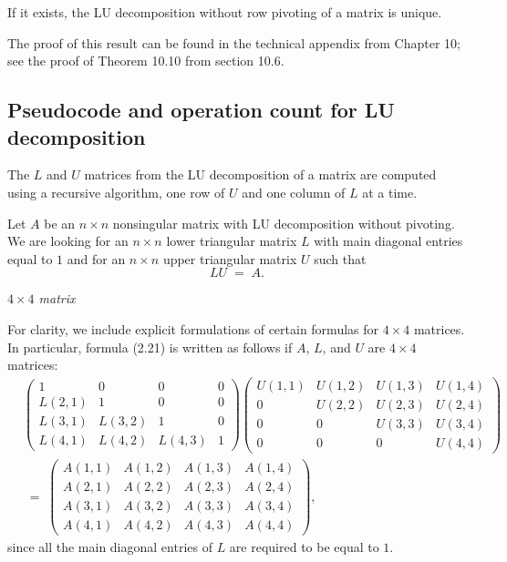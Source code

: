 \begin{theorem}
If it exists, the LU decomposition without row pivoting of a matrix is
unique.
\end{theorem}

The proof of this result can be found in the technical appendix from
Chapter 10; see the proof of Theorem 10.10 from section 10.6.

\subsection{Pseudocode and operation count for LU decomposition}

The $L$ and $U$ matrices from the LU decomposition of a matrix are
computed using a recursive algorithm, one row of $U$ and one column of
$L$ at a time.

Let $A$ be an $n\times n$ nonsingular matrix with LU decomposition
without pivoting. We are looking for an $n\times n$ lower triangular
matrix $L$ with main diagonal entries equal to $1$ and for an $n\times
n$ upper triangular matrix $U$ such that
\begin{equation}
LU \;=\; A.
\end{equation}

\begin{examplex}
\textit{$4\times 4$ matrix}\par
For clarity, we include explicit formulations of certain formulas for
$4\times 4$ matrices. In particular, formula (2.21) is written as
follows if $A$, $L$, and $U$ are $4\times 4$ matrices:
\[
\begin{aligned}
&\begin{pmatrix}
1 & 0 & 0 & 0\\
L(2,1) & 1 & 0 & 0\\
L(3,1) & L(3,2) & 1 & 0\\
L(4,1) & L(4,2) & L(4,3) & 1
\end{pmatrix}
\begin{pmatrix}
U(1,1) & U(1,2) & U(1,3) & U(1,4)\\
0 & U(2,2) & U(2,3) & U(2,4)\\
0 & 0 & U(3,3) & U(3,4)\\
0 & 0 & 0 & U(4,4)
\end{pmatrix}\\[4pt]
&\;=\;
\begin{pmatrix}
A(1,1) & A(1,2) & A(1,3) & A(1,4)\\
A(2,1) & A(2,2) & A(2,3) & A(2,4)\\
A(3,1) & A(3,2) & A(3,3) & A(3,4)\\
A(4,1) & A(4,2) & A(4,3) & A(4,4)
\end{pmatrix},
\end{aligned}
\]
since all the main diagonal entries of $L$ are required to be equal to
$1$.
\end{examplex}
